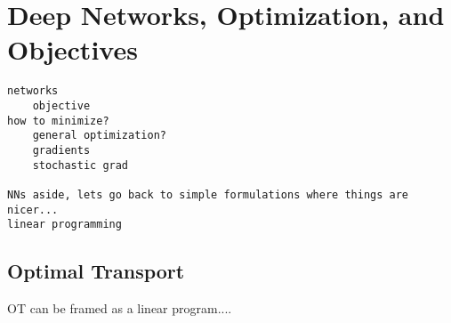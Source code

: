 \section{Deep Networks, Optimization, and Objectives}
\begin{verbatim}
networks
    objective
how to minimize?
    general optimization?
    gradients
    stochastic grad

NNs aside, lets go back to simple formulations where things are nicer...
linear programming
\end{verbatim}

\subsection{Optimal Transport}
    OT can be framed as a linear program....
